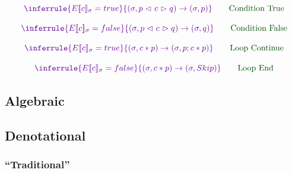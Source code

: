 \[\mcolour
\inferrule
 { E\sem{c}_\sigma = true }
 {(\sigma,p \cond c q) \then (\sigma, p)}
 \qquad \say{Condition True}
\]

\[\mcolour
\inferrule
 { E\sem{c}_\sigma = false }
 {(\sigma,p \cond c q) \then (\sigma, q)}
 \qquad \say{Condition False}
\]

\[\mcolour
\inferrule
 { E\sem{c}_\sigma = true }
 {(\sigma,c * p) \then (\sigma, p ; c * p)}
 \qquad \say{Loop Continue}
\]

\[\mcolour
\inferrule
 { E\sem{c}_\sigma = false }
 {(\sigma,c * p) \then (\sigma, Skip)}
 \qquad \say{Loop End}
\]


\subsection{Algebraic}


\subsection{Denotational}

\subsubsection{``Traditional''}


